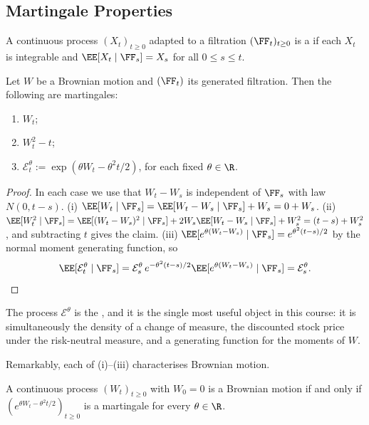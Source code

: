 \subsection{Martingale Properties}

\begin{definition}
	A continuous process $(X_t)_{t\geq0}$ adapted to a filtration $(\FF_t)_{t\geq0}$ is a  if each $X_t$ is integrable and $\EE[X_t\mid\FF_s] = X_s$ for all $0\leq s\leq t$.
\end{definition}

\begin{proposition}\label{prop:bm-martingales}
	Let $W$ be a Brownian motion and $(\FF_t)$ its generated filtration. Then the following are martingales:
	\begin{enumerate}[label=(\roman*)]
		\item $W_t$;
		\item $W_t^2 - t$;
		\item $\mathcal{E}^\theta_t := \exp(\theta W_t - \theta^2 t/2)$, for each fixed $\theta \in \R$.
	\end{enumerate}
\end{proposition}

\begin{proof}
	In each case we use that $W_t - W_s$ is independent of $\FF_s$ with law $N(0,t-s)$.
	(i) $\EE[W_t\mid\FF_s] = \EE[W_t-W_s\mid\FF_s] + W_s = 0 + W_s$.
	(ii) $\EE[W_t^2\mid\FF_s] = \EE[(W_t-W_s)^2\mid\FF_s] + 2W_s\EE[W_t-W_s\mid\FF_s] + W_s^2 = (t-s) + W_s^2$, and subtracting $t$ gives the claim.
	(iii) $\EE[e^{\theta(W_t-W_s)}\mid\FF_s] = e^{\theta^2(t-s)/2}$ by the normal moment generating function, so
	$$
	\EE[\mathcal{E}^\theta_t\mid\FF_s] = \mathcal{E}^\theta_s\, e^{-\theta^2(t-s)/2}\EE[e^{\theta(W_t-W_s)}\mid\FF_s] = \mathcal{E}^\theta_s. \qedhere
	$$
\end{proof}

The process $\mathcal{E}^\theta$ is the , and it is the single most useful object in this course: it is simultaneously the density of a change of measure, the discounted stock price under the risk-neutral measure, and a generating function for the moments of $W$.

Remarkably, each of (i)--(iii) characterises Brownian motion.

\begin{theorem}\label{thm:bm-char-exp}
	A continuous process $(W_t)_{t\geq0}$ with $W_0 = 0$ is a Brownian motion if and only if $(e^{\theta W_t - \theta^2t/2})_{t\geq0}$ is a martingale for every $\theta \in \R$.
\end{theorem}

